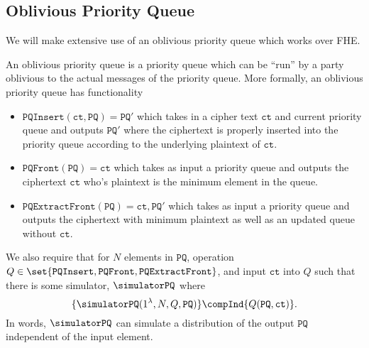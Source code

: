 \newcommand{\ct}{\texttt{ct}}

\subsection{Oblivious Priority Queue}
We will make extensive use of an oblivious priority queue which works over FHE.

\newcommand{\PQInsert}{\texttt{PQInsert}}
\newcommand{\PQFront}{\texttt{PQFront}}
\newcommand{\PQExtractFront}{\texttt{PQExtractFront}}
\newcommand{\PQ}{\texttt{PQ}}
\newcommand{\hybrid}[1]{\mathrm{\textbf{Hyb}}_{#1}}

\begin{definition}
	An oblivious priority queue is a priority queue which can be ``run'' by a party oblivious to the actual
	messages of the priority queue. More formally, an oblivious priority queue has functionality
	\begin{itemize}
		\item $\PQInsert(\ct, \PQ) = \PQ'$ which takes in a cipher text $\ct$ and current priority queue and outputs $\PQ'$ where 
		the ciphertext is properly inserted into the priority queue according to the underlying plaintext of $\ct$.
		\item $\PQFront(\PQ) = \ct$ which takes as input a priority queue and outputs the ciphertext $\ct$ who's plaintext is the minimum element in the queue.
		\item $\PQExtractFront(\PQ) = \ct, \PQ'$ which takes as input a priority queue and outputs the ciphertext with minimum plaintext as well as an updated queue without $\ct$.
	\end{itemize}
	We also require that for $N$ elements in $\PQ$, operation $Q \in \set{\PQInsert, \PQFront, \PQExtractFront}$,
	and input $\ct$ into $Q$ such that there is some simulator, $\simulatorPQ$ where
	\begin{equation}
		\{\simulatorPQ(1^\lambda, N, Q, \PQ) \} \compInd	\{Q(\PQ, \ct) \}.
	\end{equation}
	In words, $\simulatorPQ$ can simulate a distribution of the output $\PQ$ independent of the input element.
\end{definition}

